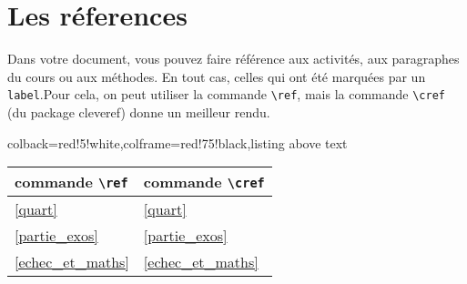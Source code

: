\begin{activities}



\end{activities}


\section{Les réferences}

Dans votre document, vous pouvez faire référence aux activités, aux paragraphes du cours ou aux méthodes. En tout cas, celles qui ont été marquées par un \verb!label!.Pour cela, on peut utiliser la commande  \verb!\ref!, mais la commande \verb!\cref! (du package cleveref) donne un meilleur rendu. 

\begin{tcblisting}{colback=red!5!white,colframe=red!75!black,listing above text}
{
\renewcommand{\arraystretch}{2}
\setlength{\tabcolsep}{1cm}
\begin{tabular}{|l|l|}  \hline
\bfseries commande \verb!\ref! &\bfseries  commande \verb!\cref! \\ \hline  
\ref{quart} &
\cref{quart}
\\ \hline 
\ref{partie_exos} &
\cref{partie_exos}
\\ \hline 
\ref{echec_et_maths} &
\cref{echec_et_maths} \\ \hline 
\end{tabular}
}
\end{tcblisting}

